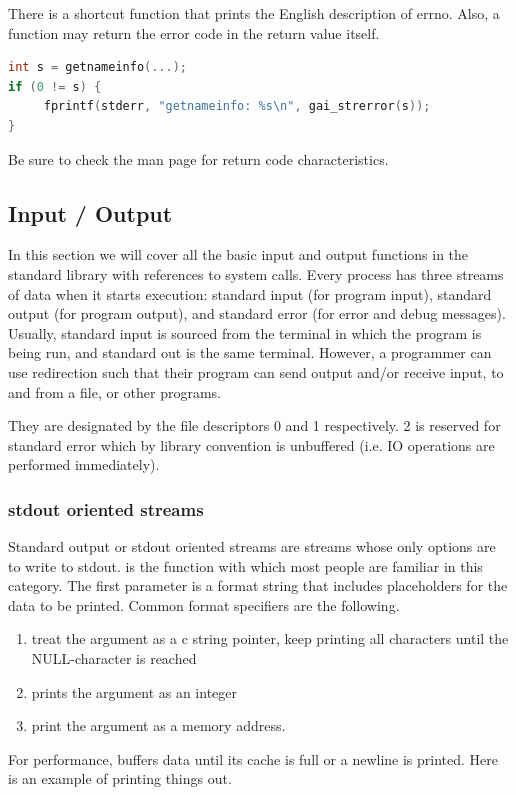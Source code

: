 There is a shortcut function  that prints the English description of errno.
Also, a function may return the error code in the return value itself.

\begin{lstlisting}[language=C]
int s = getnameinfo(...);
if (0 != s) {
     fprintf(stderr, "getnameinfo: %s\n", gai_strerror(s));
}
\end{lstlisting}

Be sure to check the man page for return code characteristics.

\subsection{Input / Output}

In this section we will cover all the basic input and output functions in the standard library with references to system calls.
Every process has three streams of data when it starts execution: standard input (for program input), standard output (for program output), and standard error (for error and debug messages).
Usually, standard input is sourced from the terminal in which the program is being run, and standard out is the same terminal.
However, a programmer can use redirection such that their program can send output and/or receive input, to and from a file, or other programs.

They are designated by the file descriptors 0 and 1 respectively. 2 is reserved for standard error which by library convention is unbuffered (i.e. IO operations are performed immediately).

\subsubsection{stdout oriented streams}

Standard output or stdout oriented streams are streams whose only options are to write to stdout.
 is the function with which most people are familiar in this category.
The first parameter is a format string that includes placeholders for the data to be printed.
Common format specifiers are the following.
\begin{enumerate}
\item {} treat the argument as a c string pointer, keep printing all characters until the NULL-character is reached
\item {} prints the argument as an integer
  \item {} print the argument as a memory address.
    \end{enumerate}
For performance,  buffers data until its cache is full or a newline is printed.
Here is an example of printing things out.

